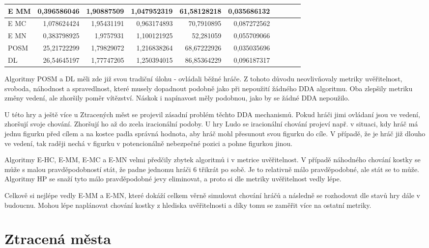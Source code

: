 \begin{table*}[b]
\begin{center}
\begin{tabular}{| l || r | r | r | r | r | r | r | r | r |}
E MM & 0,396586046 & 1,90887509 & 1,047952319 & 61,58128218 & 0,035686132 \\ \hline  
E MC & 1,078624424 & 1,95431191 & 0,963174893 & 70,7910895 & 0,087272562 \\ \hline  
E MN & 0,383798925 & 1,9757931 & 1,100121925 & 52,281059 & 0,055709066 \\ \hline  
POSM & 25,21722299 & 1,79829072 & 1,216838264 & 68,67222926 & 0,035035696 \\ \hline  
DL & 26,54645197 & 1,77747205 & 1,250394015 & 86,85364229 & 0,096187317 \\ \hline  
\end{tabular}
\end{center}
\end{table*}

Algoritmy POSM a DL měli zde již svou tradiční úlohu - ovládali běžné hráče. Z tohoto důvodu neovlivňovaly metriky uvěřitelnost, svoboda, náhodnost a spravedlnost, které musely dopadnout podobně jako při nepoužití žádného DDA algoritmu. Oba zlepšily metriku změny vedení, ale zhoršily poměr vítězství. Náskok i napínavost měly podobnou, jako by se žádné DDA nepoužilo. 

U této hry a ještě více u Ztracených měst se projevil zásadní problém těchto DDA mechanismů. Pokud hráči jimi ovládaní jsou ve vedení, zhoršují svoje chování. Zhoršují ho až do zcela iracionální podoby. U hry Ludo se iracionální chování projeví např. v situaci, kdy hráč má jednu figurku před cílem a na kostce padla správná hodnota, aby hráč mohl přesunout svou figurku do cíle. V případě, že je hráč již dlouho ve vedení, tak raději nechá v figurku v potencionálně nebezpečné pozici a pohne figurkou jinou. 

Algoritmy E-HC, E-MM, E-MC a E-MN velmi předčily zbytek algoritmů i v metrice uvěřitelnost. V případě náhodného chování kostky se může s malou pravděpodobností stát, že padne jednomu hráči 6 třikrát po sobě. Je to relativně málo pravděpodobné, ale stát se to může. Algoritmy HP se snaží tyto málo pravděpodobné jevy eliminovat, a proto si dle metriky uvěřitelnost vedly lépe.

Celkově si nejlépe vedly E-MM a E-MN, které dokáží celkem věrně simulovat chování hráčů a následně se rozhodovat dle stavů hry dále v budoucnu. Mohou lépe naplánovat chování kostky z hlediska uvěřitelnosti a díky tomu se zaměřit více na ostatní metriky.

\section{Ztracená města}

